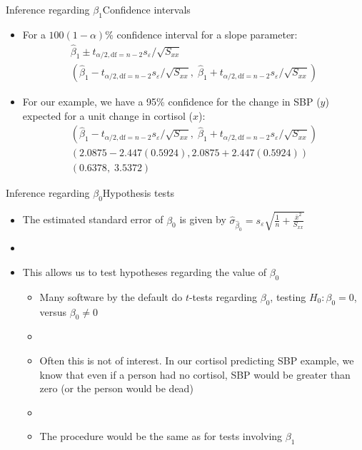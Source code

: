 \documentclass[xcolor=dvipsnames]{beamer}
\begin{document}
\begin{frame}{Inference regarding $\beta_1$}{Confidence intervals}
\begin{itemize}
	\item For a $100(1-\alpha)\%$ confidence interval for a slope parameter: 
	\begin{gather*}
		\hat{\beta}_1 \pm t_{\alpha / 2,\text{df}=n-2} {s_{\varepsilon} / \sqrt{S_{xx}}} \\
		\left(\hat{\beta}_1 - t_{\alpha / 2,\text{df}=n-2} {s_{\varepsilon} / \sqrt{S_{xx}}},\; \hat{\beta}_1 + t_{\alpha / 2,\text{df}=n-2} {s_{\varepsilon} / \sqrt{S_{xx}}}\right)
	\end{gather*}

	\item For our example, we have a 95\% confidence for the change in SBP ($y$) expected for a unit change in cortisol ($x$):
	\begin{gather*}
		\left(\hat{\beta}_1 - t_{\alpha / 2,\text{df}=n-2} {s_{\varepsilon} / \sqrt{S_{xx}}},\; \hat{\beta}_1 + t_{\alpha / 2,\text{df}=n-2} {s_{\varepsilon} / \sqrt{S_{xx}}}\right) \\ 
		(2.0875 - 2.447(0.5924), 2.0875 + 2.447(0.5924))
		\\
		(0.6378,\; 3.5372)
	\end{gather*}
\end{itemize}
\end{frame}

\begin{frame}{Inference regarding $\beta_0$}{Hypothesis tests}
	\begin{itemize}
		\item The estimated standard error of $\beta_0$ is given by $\hat{\sigma}_{\hat{\beta}_0} = s_{\varepsilon} \sqrt{\frac{1}{n}+\frac{\bar{x}^2}{S_{xx}}}$
		\item[]
		\item This allows us to test hypotheses regarding the value of $\beta_0$
		\begin{itemize}
			\item Many software by the default do $t$-tests regarding $\beta_0$, testing $H_0: \beta_0 = 0$, versus $\beta_0 \neq 0$
			\item[]
			\item Often this is not of interest. In our cortisol predicting SBP example, we know that even if a person had no cortisol, SBP would be greater than zero (or the person would be dead)
			\item[]
			\item The procedure would be the same as for tests involving $\beta_1$
		\end{itemize}
		
	\end{itemize}
\end{frame}
\end{document}
